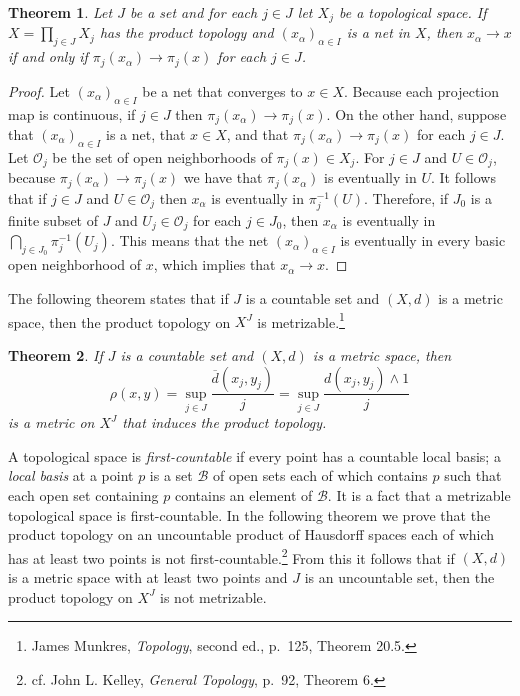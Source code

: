\documentclass{article}
\newtheorem{theorem}{Theorem}
\theoremstyle{definition}
\begin{document}
\begin{theorem}
Let $J$ be a set and for each $j \in J$ let $X_j$ be a topological space. If $X=\prod_{j \in J} X_j$ has the product topology
and $(x_\alpha)_{\alpha \in I}$ is a net in $X$, then $x_\alpha \to x$ if and only if $\pi_j(x_\alpha) \to \pi_j(x)$ for each $j \in J$.
\end{theorem}
\begin{proof}
Let $(x_\alpha)_{\alpha \in I}$ be a net that converges to $x \in X$. Because each projection map is continuous, if $j \in J$ then
$\pi_j(x_\alpha) \to \pi_j(x)$. On the other hand, suppose that $(x_\alpha)_{\alpha \in I}$ is a net, that $x \in X$,
 and that $\pi_j(x_\alpha) \to \pi_j(x)$
for each $j \in J$. Let $\mathscr{O}_j$ be the set of open neighborhoods of $\pi_j(x) \in X_j$. 
For $j \in J$ and $U \in \mathscr{O}_j$, because 
$\pi_j(x_\alpha) \to \pi_j(x)$ we have that
$\pi_j(x_\alpha)$ is eventually in $U$. It follows that
if $j \in J$ and $U \in \mathscr{O}_j$ then  $x_\alpha$ is eventually in $\pi_j^{-1}(U)$.
Therefore, if $J_0$ is a finite subset of $J$ and $U_j \in \mathscr{O}_j$ for each $j \in J_0$, then 
$x_\alpha$ is eventually in $\bigcap_{j \in J_0} \pi_j^{-1}(U_j)$. This means that the net $(x_\alpha)_{\alpha \in I}$ is eventually
in every basic open neighborhood of $x$, which implies that $x_\alpha \to x$.
\end{proof}

The following theorem states that 
if $J$ is a countable set and $(X,d)$ is a metric space, then the product topology on $X^J$ is metrizable.\footnote{James
Munkres, {\em Topology}, second ed., p.~125, Theorem 20.5.}

\begin{theorem}
If $J$ is a countable set and $(X,d)$ is a metric space, then
\[
\rho(x,y)=\sup_{j \in J} \frac{\overline{d}(x_j,y_j)}{j} = \sup_{j \in J} \frac{d(x_j,y_j) \wedge 1}{j}
\]
is a metric on $X^J$ that induces the product topology.
\end{theorem}

A topological space is {\em first-countable} if every point has a countable
local basis; a {\em local basis} at a point $p$ is a set $\mathscr{B}$ of open sets each of which contains $p$  such that each open set
containing $p$ contains an element of $\mathscr{B}$. 
It is a fact that a metrizable topological space is first-countable. In the following theorem we prove that the product topology on 
an uncountable product
of Hausdorff spaces each of which has at least two points is not first-countable.\footnote{cf. John L. Kelley,
{\em General Topology}, p.~92, Theorem 6.} From this it follows that if $(X,d)$ is a metric space  with
at least two points and $J$
is an uncountable set, then the product topology on $X^J$ is not metrizable.
\end{document}
